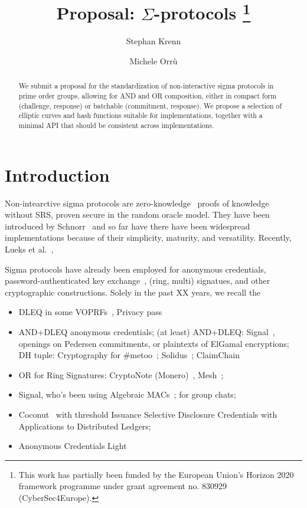 \documentclass[runningheads]{llncs}
\begin{document}
\title{Proposal: $\Sigma$-protocols%
\thanks{This work has partially been funded by the European Union's Horizon 2020 framework programme under grant agreement no. 830929 (CyberSec4Europe).}}
%

\author{Stephan Krenn\and
        Michele Orr\`u}


%
\maketitle              %
%
\begin{abstract}
  We submit a proposal for the standardization of non-interactive sigma protocols in prime order groups, allowing for AND and OR composition, either in compact form (challenge, response) or batchable (commitment, response). We propose a selection of elliptic curves and hash functions suitable for implementations, together with a minimal API that should be consistent across implementations.

\end{abstract}

\section{Introduction}
Non-intearctive sigma protocols are zero-knowledge~\cite{GolMicRac89} proofs of knowledge~\cite{XX} without SRS, proven secure in the random oracle model.
They have been introduced by Schnorr~\cite{??} and so far have there have been widespread implementations because of their simplicity, maturity, and versatility.
Recently, Lueks et al.~\cite{zksk},

Sigma protocols have already been employed for anonymous credentials, password-authenticated key exchange~\cite{jpake}, (ring, multi)  signatues, and other
cryptographic constructions. Solely in the past XX years, we recall the
\begin{itemize}
  \item DLEQ in some VOPRFs~\cite{cfrg-voprf}, Privacy pass
  \item AND+DLEQ anonymous credentials; (at least) AND+DLEQ: Signal~\cite{CCS:ChaPerZav20}, openings on Pedersen commitments, or plaintexts of ElGamal encryptions; DH tuple: Cryptography for \#metoo~\cite{PoPETS:KuyKraRab19}; Solidus~\cite{CCS:CZJKJS17}; ClaimChain~\cite{ClaimChain}
  \item OR for Ring Signatures: CryptoNote (Monero)~\cite{monero}, Mesh~\cite{PoPETS:AlTGon19};
  \item Signal, who's been using Algebraic MACs~\cite{CCS:ChaMeiZav14}; for group chats;
  \item Coconut~\cite{NDSS:SABMD19} with threshold Issuance Selective Disclosure Credentials with Applications to Distributed Ledgers;
   \item Anonymous Credentials Light
\end{itemize}
\end{document}
